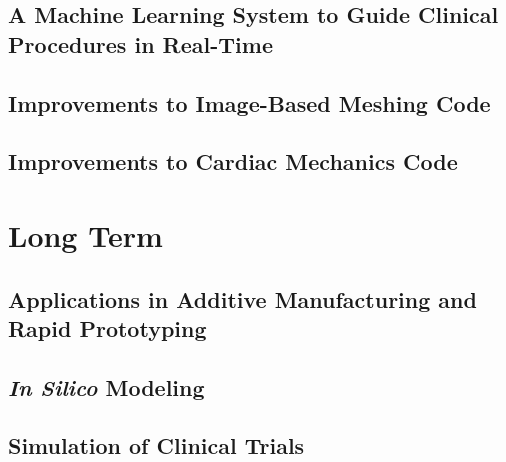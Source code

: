 \subsection{A Machine Learning System to Guide Clinical Procedures in Real-Time}
\label{A Machine Learning System to Guide Clinical Procedures in Real-Time}

\subsection{Improvements to Image-Based Meshing Code}
\label{Improvements to Image-Based Meshing Code}

\subsection{Improvements to Cardiac Mechanics Code}
\label{Improvements to Cardiac Mechanics Code}

\section{Long Term}
\label{Long Term}

\subsection{Applications in Additive Manufacturing and Rapid Prototyping}
\label{Applications in Additive Manufacturing and Rapid Prototyping}

\subsection{\textit{In Silico} Modeling}
\label{In Silico Modeling}

\subsection{Simulation of Clinical Trials}
\label{Simulation of Clinical Trials}

